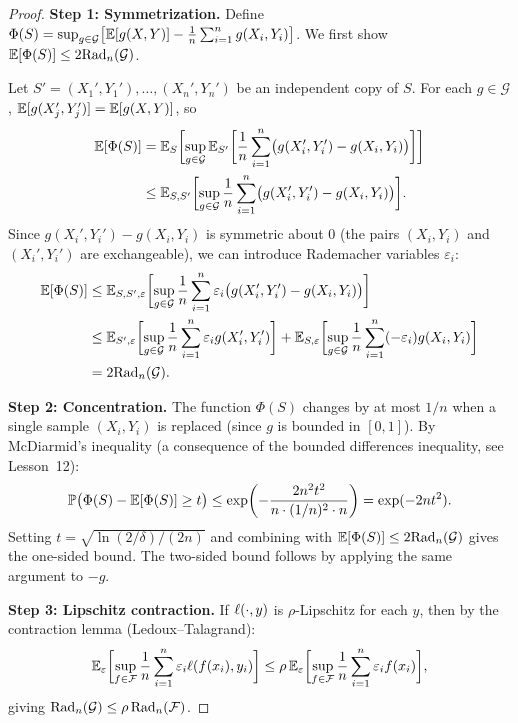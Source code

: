 \documentclass[11pt,a4paper]{article}
\begin{document}
\begin{proof}
\textbf{Step 1: Symmetrization.}
Define $\Phi(S) = \sup_{g \in \mathcal{G}} \bigl[
\mathbb{E}[g(X,Y)] - \frac{1}{n} \sum_{i=1}^n g(X_i, Y_i) \bigr]$.
We first show $\mathbb{E}[\Phi(S)] \le 2 \mathrm{Rad}_n(\mathcal{G})$.

Let $S' = (X_1', Y_1'), \ldots, (X_n', Y_n')$ be an independent
copy of $S$.  For each $g \in \mathcal{G}$,
$\mathbb{E}[g(X_j', Y_j')] = \mathbb{E}[g(X,Y)]$, so
\begin{align*}
  \mathbb{E}[\Phi(S)]
  &= \mathbb{E}_S\biggl[ \sup_{g \in \mathcal{G}} \mathbb{E}_{S'}\biggl[
    \frac{1}{n} \sum_{i=1}^n
    \bigl(g(X_i', Y_i') - g(X_i, Y_i)\bigr) \biggr] \biggr] \\
  &\le \mathbb{E}_{S, S'}\biggl[ \sup_{g \in \mathcal{G}}
    \frac{1}{n} \sum_{i=1}^n
    \bigl(g(X_i', Y_i') - g(X_i, Y_i)\bigr) \biggr].
\end{align*}
Since $g(X_i', Y_i') - g(X_i, Y_i)$ is symmetric about $0$
(the pairs $(X_i, Y_i)$ and $(X_i', Y_i')$ are exchangeable), we
can introduce Rademacher variables $\varepsilon_i$:
\begin{align*}
  \mathbb{E}[\Phi(S)]
  &\le \mathbb{E}_{S, S', \varepsilon}\biggl[ \sup_{g \in \mathcal{G}}
    \frac{1}{n} \sum_{i=1}^n \varepsilon_i
    \bigl(g(X_i', Y_i') - g(X_i, Y_i)\bigr) \biggr] \\
  &\le \mathbb{E}_{S', \varepsilon}\biggl[ \sup_{g \in \mathcal{G}}
    \frac{1}{n} \sum_{i=1}^n \varepsilon_i g(X_i', Y_i')
    \biggr]
  + \mathbb{E}_{S, \varepsilon}\biggl[ \sup_{g \in \mathcal{G}}
    \frac{1}{n} \sum_{i=1}^n (-\varepsilon_i) g(X_i, Y_i) \biggr] \\
  &= 2 \mathrm{Rad}_n(\mathcal{G}).
\end{align*}

\textbf{Step 2: Concentration.}
The function $\Phi(S)$ changes by at most $1/n$ when a single sample
$(X_i, Y_i)$ is replaced (since $g$ is bounded in $[0,1]$).  By
McDiarmid's inequality (a consequence of the bounded differences
inequality, see Lesson~12):
\[
  \mathbb{P}\bigl( \Phi(S) - \mathbb{E}[\Phi(S)] \ge t \bigr)
  \le \exp\biggl( -\frac{2n^2 t^2}{n \cdot (1/n)^2 \cdot n} \biggr)
  = \exp(-2nt^2).
\]
Setting $t = \sqrt{\ln(2/\delta)/(2n)}$ and combining with
$\mathbb{E}[\Phi(S)] \le 2\mathrm{Rad}_n(\mathcal{G})$ gives the one-sided bound.
The two-sided bound follows by applying the same argument to $-g$.

\textbf{Step 3: Lipschitz contraction.}
If $\ell(\cdot, y)$ is $\rho$-Lipschitz for each $y$, then by
the contraction lemma (Ledoux--Talagrand):
\[
  \mathbb{E}_\varepsilon\biggl[ \sup_{f \in \mathcal{F}} \frac{1}{n}
    \sum_{i=1}^n \varepsilon_i \ell(f(x_i), y_i) \biggr]
  \le \rho \, \mathbb{E}_\varepsilon\biggl[ \sup_{f \in \mathcal{F}}
    \frac{1}{n} \sum_{i=1}^n \varepsilon_i f(x_i) \biggr],
\]
giving $\mathrm{Rad}_n(\mathcal{G}) \le \rho \, \mathrm{Rad}_n(\mathcal{F})$.
\end{proof}
\end{document}
